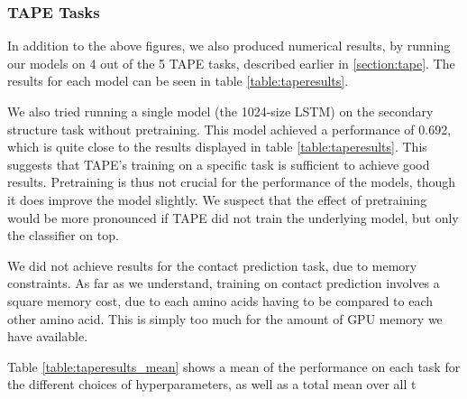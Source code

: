 \documentclass[a4paper,12pt]{article}
\begin{document}
\subsubsection{TAPE Tasks}
\label{section:TAPE_results}
In addition to the above figures, we also produced numerical results, by running our models on 4 out of the 5 TAPE tasks, described earlier in \ref{section:tape}. The results for each model can be seen in table \ref{table:taperesults}.

We also tried running a single model (the 1024-size LSTM) on the secondary structure task without pretraining. This model achieved a performance of 0.692, which is quite close to the results displayed in table \ref{table:taperesults}. This suggests that TAPE's training on a specific task is sufficient to achieve good results. Pretraining is thus not crucial for the performance of the models, though it does improve the model slightly. We suspect that the effect of pretraining would be more pronounced if TAPE did not train the underlying model, but only the classifier on top.

We did not achieve results for the contact prediction task, due to memory constraints. As far as we understand, training on contact prediction involves a square memory cost, due to each amino acids having to be compared to each other amino acid. This is simply too much for the amount of GPU memory we have available.

Table \ref{table:taperesults_mean} shows a mean of the performance on each task for the different choices of hyperparameters, as well as a total mean over all t
\end{document}
